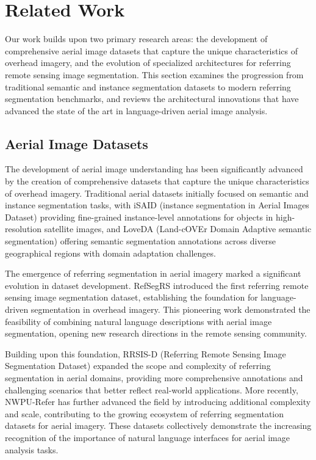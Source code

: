 
\section{Related Work}
\label{sec:related}

Our work builds upon two primary research areas: the development of comprehensive aerial image datasets that capture the unique characteristics of overhead imagery, and the evolution of specialized architectures for referring remote sensing image segmentation. This section examines the progression from traditional semantic and instance segmentation datasets to modern referring segmentation benchmarks, and reviews the architectural innovations that have advanced the state of the art in language-driven aerial image analysis.

\subsection{Aerial Image Datasets}

The development of aerial image understanding has been significantly advanced by the creation of comprehensive datasets that capture the unique characteristics of overhead imagery. Traditional aerial datasets initially focused on semantic and instance segmentation tasks, with iSAID (instance segmentation in Aerial Images Dataset) providing fine-grained instance-level annotations for objects in high-resolution satellite images, and LoveDA (Land-cOVEr Domain Adaptive semantic segmentation) offering semantic segmentation annotations across diverse geographical regions with domain adaptation challenges.

The emergence of referring segmentation in aerial imagery marked a significant evolution in dataset development. RefSegRS introduced the first referring remote sensing image segmentation dataset, establishing the foundation for language-driven segmentation in overhead imagery. This pioneering work demonstrated the feasibility of combining natural language descriptions with aerial image segmentation, opening new research directions in the remote sensing community.

Building upon this foundation, RRSIS-D (Referring Remote Sensing Image Segmentation Dataset) expanded the scope and complexity of referring segmentation in aerial domains, providing more comprehensive annotations and challenging scenarios that better reflect real-world applications. More recently, NWPU-Refer has further advanced the field by introducing additional complexity and scale, contributing to the growing ecosystem of referring segmentation datasets for aerial imagery. These datasets collectively demonstrate the increasing recognition of the importance of natural language interfaces for aerial image analysis tasks.

